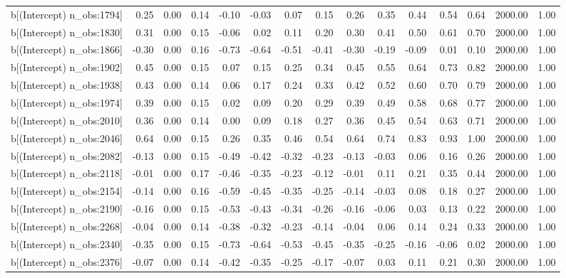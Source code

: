 \begin{table}[ht]
\begin{tabular}{rrrrrrrrrrrrrrr}
  b[(Intercept) n\_obs:1794] & 0.25 & 0.00 & 0.14 & -0.10 & -0.03 & 0.07 & 0.15 & 0.26 & 0.35 & 0.44 & 0.54 & 0.64 & 2000.00 & 1.00 \\ 
  b[(Intercept) n\_obs:1830] & 0.31 & 0.00 & 0.15 & -0.06 & 0.02 & 0.11 & 0.20 & 0.30 & 0.41 & 0.50 & 0.61 & 0.70 & 2000.00 & 1.00 \\ 
  b[(Intercept) n\_obs:1866] & -0.30 & 0.00 & 0.16 & -0.73 & -0.64 & -0.51 & -0.41 & -0.30 & -0.19 & -0.09 & 0.01 & 0.10 & 2000.00 & 1.00 \\ 
  b[(Intercept) n\_obs:1902] & 0.45 & 0.00 & 0.15 & 0.07 & 0.15 & 0.25 & 0.34 & 0.45 & 0.55 & 0.64 & 0.73 & 0.82 & 2000.00 & 1.00 \\ 
  b[(Intercept) n\_obs:1938] & 0.43 & 0.00 & 0.14 & 0.06 & 0.17 & 0.24 & 0.33 & 0.42 & 0.52 & 0.60 & 0.70 & 0.79 & 2000.00 & 1.00 \\ 
  b[(Intercept) n\_obs:1974] & 0.39 & 0.00 & 0.15 & 0.02 & 0.09 & 0.20 & 0.29 & 0.39 & 0.49 & 0.58 & 0.68 & 0.77 & 2000.00 & 1.00 \\ 
  b[(Intercept) n\_obs:2010] & 0.36 & 0.00 & 0.14 & 0.00 & 0.09 & 0.18 & 0.27 & 0.36 & 0.45 & 0.54 & 0.63 & 0.71 & 2000.00 & 1.00 \\ 
  b[(Intercept) n\_obs:2046] & 0.64 & 0.00 & 0.15 & 0.26 & 0.35 & 0.46 & 0.54 & 0.64 & 0.74 & 0.83 & 0.93 & 1.00 & 2000.00 & 1.00 \\ 
  b[(Intercept) n\_obs:2082] & -0.13 & 0.00 & 0.15 & -0.49 & -0.42 & -0.32 & -0.23 & -0.13 & -0.03 & 0.06 & 0.16 & 0.26 & 2000.00 & 1.00 \\ 
  b[(Intercept) n\_obs:2118] & -0.01 & 0.00 & 0.17 & -0.46 & -0.35 & -0.23 & -0.12 & -0.01 & 0.11 & 0.21 & 0.35 & 0.44 & 2000.00 & 1.00 \\ 
  b[(Intercept) n\_obs:2154] & -0.14 & 0.00 & 0.16 & -0.59 & -0.45 & -0.35 & -0.25 & -0.14 & -0.03 & 0.08 & 0.18 & 0.27 & 2000.00 & 1.00 \\ 
  b[(Intercept) n\_obs:2190] & -0.16 & 0.00 & 0.15 & -0.53 & -0.43 & -0.34 & -0.26 & -0.16 & -0.06 & 0.03 & 0.13 & 0.22 & 2000.00 & 1.00 \\ 
  b[(Intercept) n\_obs:2268] & -0.04 & 0.00 & 0.14 & -0.38 & -0.32 & -0.23 & -0.14 & -0.04 & 0.06 & 0.14 & 0.24 & 0.33 & 2000.00 & 1.00 \\ 
  b[(Intercept) n\_obs:2340] & -0.35 & 0.00 & 0.15 & -0.73 & -0.64 & -0.53 & -0.45 & -0.35 & -0.25 & -0.16 & -0.06 & 0.02 & 2000.00 & 1.00 \\ 
  b[(Intercept) n\_obs:2376] & -0.07 & 0.00 & 0.14 & -0.42 & -0.35 & -0.25 & -0.17 & -0.07 & 0.03 & 0.11 & 0.21 & 0.30 & 2000.00 & 1.00 \\ 

\end{tabular}
\end{table}

